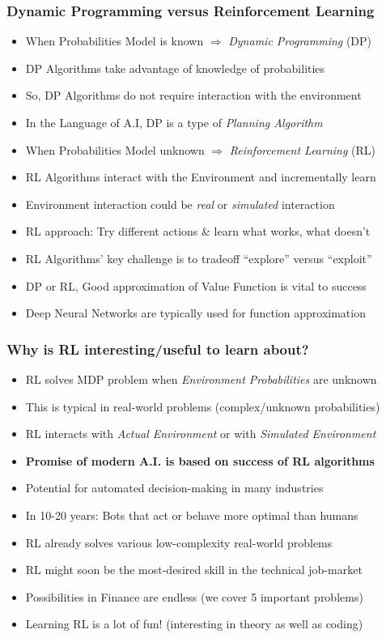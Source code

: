 \documentclass[handout]{beamer}
\begin{document}
\begin{frame}
\frametitle{Dynamic Programming versus Reinforcement Learning}
\pause
\begin{itemize}[<+->]
\item When Probabilities Model is known $\Rightarrow$ {\em Dynamic Programming} (DP)
\item DP Algorithms take advantage of knowledge of probabilities
\item So, DP Algorithms do not require interaction with the environment
\item In the Language of A.I, DP is a type of {\em Planning Algorithm}
\item When Probabilities Model unknown $\Rightarrow$ {\em Reinforcement Learning} (RL)
\item RL Algorithms interact with the Environment and incrementally learn
\item Environment interaction could be {\em real} or {\em simulated} interaction
\item RL approach: Try different actions \& learn what works, what doesn't
\item RL Algorithms' key challenge is to tradeoff ``explore'' versus ``exploit''
\item DP or RL, Good approximation of Value Function is vital to success
\item Deep Neural Networks are typically used for function approximation
\end{itemize}
\end{frame}


\begin{frame}
\frametitle{Why is RL interesting/useful to learn about?}
\pause
\begin{itemize}[<+->]
\item RL solves MDP problem when {\em Environment Probabilities} are unknown
\item This is typical in real-world problems (complex/unknown probabilities)
\item RL interacts with {\em Actual Environment} or with {\em Simulated Environment}

\item {\bf Promise of modern A.I. is based on success of RL algorithms}
\item Potential for automated decision-making in many industries
\item In 10-20 years: Bots that act or behave more optimal than humans
\item RL already solves various low-complexity real-world problems
\item RL might soon be the most-desired skill in the technical job-market
\item Possibilities in Finance are endless (we cover 5 important problems)
\item Learning RL is a lot of fun! (interesting in theory as well as coding)
\end{itemize}
\end{frame}
\end{document}
